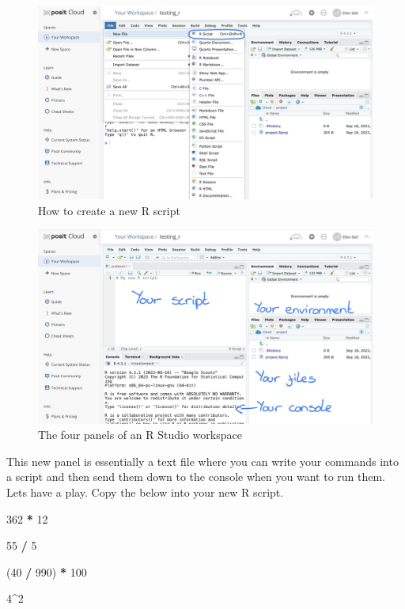 \documentclass[
]{book}
\newenvironment{Shaded}{\begin{snugshade}}{\end{snugshade}}
\newcommand{\DecValTok}[1]{\textcolor[rgb]{0.00,0.00,0.81}{#1}}
\newcommand{\NormalTok}[1]{#1}
\newcommand{\SpecialCharTok}[1]{\textcolor[rgb]{0.81,0.36,0.00}{\textbf{#1}}}
\begin{document}
\begin{figure}
\includegraphics[width=0.9\linewidth]{figures/posit6} \caption{How to create a new R script}\label{fig:unnamed-chunk-11}
\end{figure}

\begin{figure}
\includegraphics[width=0.9\linewidth]{figures/posit7} \caption{The four panels of an R Studio workspace}\label{fig:unnamed-chunk-12}
\end{figure}

This new panel is essentially a text file where you can write your commands into a script and then send them down to the console when you want to run them. Lets have a play. Copy the below into your new R script.

\begin{Shaded}
\begin{Highlighting}[]
\DecValTok{362} \SpecialCharTok{*} \DecValTok{12}

\DecValTok{55} \SpecialCharTok{/} \DecValTok{5}

\NormalTok{(}\DecValTok{40} \SpecialCharTok{/} \DecValTok{990}\NormalTok{) }\SpecialCharTok{*} \DecValTok{100}

\DecValTok{4}\SpecialCharTok{\^{}}\DecValTok{2}
\end{Highlighting}
\end{Shaded}
\end{document}

